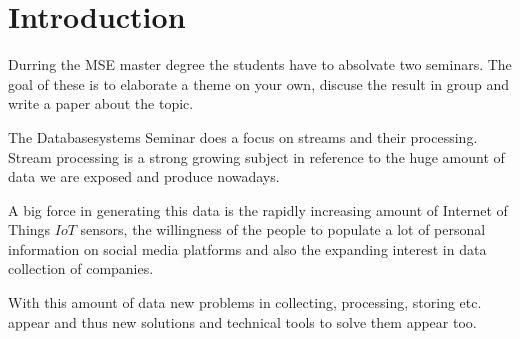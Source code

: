 \chapter{Introduction}
\label{introduction}

Durring the MSE master degree the students have to absolvate two seminars.
The goal of these is to elaborate a theme on your own, discuse the result in group and write a paper about the topic.

The Databasesystems Seminar does a focus on streams and their processing.
Stream processing is a strong growing subject in reference to the huge amount of data we are exposed and produce nowadays.

A big force in generating this data is the rapidly increasing amount of Internet of Things \(IoT\) sensors,
the willingness of the people to populate a lot of personal information on social media platforms and
also the expanding interest in data collection of companies.

With this amount of data new problems in collecting, processing, storing etc. appear
and thus new solutions and technical tools to solve them appear too.
